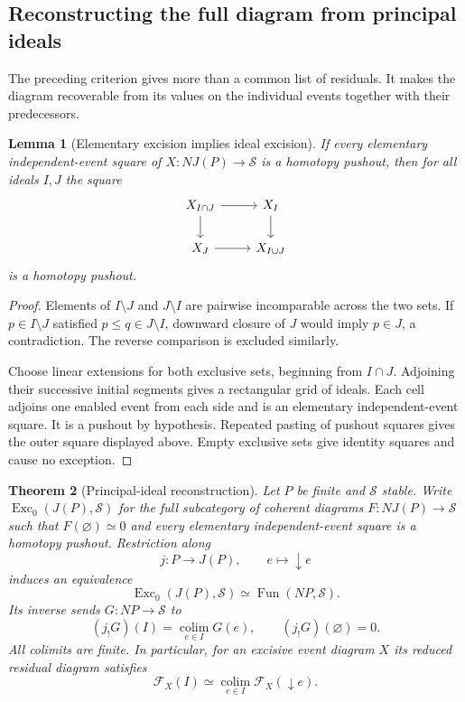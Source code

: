 \documentclass[11pt]{article}
\newtheorem{theorem}{Theorem}[section]
\newtheorem{lemma}[theorem]{Lemma}
\theoremstyle{definition}
\theoremstyle{remark}
\newcommand{\colim}{\operatorname*{colim}}
\begin{document}
\subsection{Reconstructing the full diagram from principal ideals}

The preceding criterion gives more than a common list of residuals. It makes the diagram recoverable from its values on the individual events together with their predecessors.

\begin{lemma}[Elementary excision implies ideal excision]\label{lem:ideal-excision}
If every elementary independent-event square of $X:NJ(P)\to\mathcal S$ is a homotopy pushout, then for all ideals $I,J$ the square
\[
\begin{tikzcd}
 X_{I\cap J}\arrow[r]\arrow[d] &X_I\arrow[d]\\
 X_J\arrow[r]&X_{I\cup J}
\end{tikzcd}
\]
is a homotopy pushout.
\end{lemma}

\begin{proof}
Elements of $I\setminus J$ and $J\setminus I$ are pairwise incomparable across the two sets. If $p\in I\setminus J$ satisfied $p\le q\in J\setminus I$, downward closure of $J$ would imply $p\in J$, a contradiction. The reverse comparison is excluded similarly.

Choose linear extensions for both exclusive sets, beginning from $I\cap J$. Adjoining their successive initial segments gives a rectangular grid of ideals. Each cell adjoins one enabled event from each side and is an elementary independent-event square. It is a pushout by hypothesis. Repeated pasting of pushout squares gives the outer square displayed above. Empty exclusive sets give identity squares and cause no exception.
\end{proof}

\begin{theorem}[Principal-ideal reconstruction]\label{thm:principal-reconstruction}
Let $P$ be finite and $\mathcal S$ stable. Write $\operatorname{Exc}_0(J(P),\mathcal S)$ for the full subcategory of coherent diagrams $F:NJ(P)\to\mathcal S$ such that $F(\varnothing)\simeq0$ and every elementary independent-event square is a homotopy pushout. Restriction along
\[
 j:P\longrightarrow J(P),\qquad e\longmapsto\downarrow e
\]
induces an equivalence
\[
 \operatorname{Exc}_0(J(P),\mathcal S)
 \simeq\operatorname{Fun}(NP,\mathcal S).
\]
Its inverse sends $G:NP\to\mathcal S$ to
\[
 (j_!G)(I)=\colim_{e\in I}G(e),
 \qquad (j_!G)(\varnothing)=0.
\]
All colimits are finite. In particular, for an excisive event diagram $X$ its reduced residual diagram satisfies
\[
 \boxed{\mathcal F_X(I)\simeq
 \colim_{e\in I}\mathcal F_X(\downarrow e).}
\]
\end{theorem}
\end{document}
